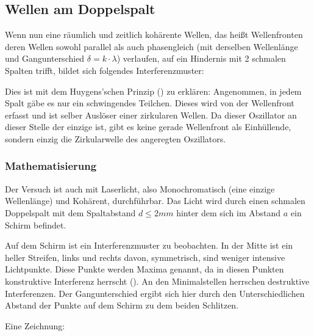 \subsection{Wellen am Doppelspalt} \label{subsec:doppelspalt}

Wenn nun eine räumlich und zeitlich kohärente Wellen, das heißt Wellenfronten deren Wellen sowohl parallel als auch phasengleich (mit derselben Wellenlänge und Gangunterschied $\delta= k \cdot \lambda$) verlaufen, auf ein Hindernis mit 2 schmalen Spalten trifft, bildet sich folgendes Interferenzmuster:


Dies ist mit dem Huygens'schen Prinzip () zu erklären: Angenommen, in jedem Spalt gäbe es nur ein schwingendes Teilchen. Dieses wird von der Wellenfront erfasst und ist selber Auslöser einer zirkularen Wellen. Da dieser Oszillator an dieser Stelle der einzige ist, gibt es keine gerade Wellenfront als Einhüllende, sondern einzig die Zirkularwelle des angeregten Oszillators.


\subsubsection{Mathematisierung}

	Der Versuch ist auch mit Laserlicht, also Monochromatisch (eine einzige Wellenlänge) und Kohärent, durchführbar. Das Licht wird durch einen schmalen Doppelspalt mit dem Spaltabstand $d \leq 2mm$ hinter dem sich im Abstand $a$ ein Schirm befindet. 
	
	Auf dem Schirm ist ein Interferenzmuster zu beobachten. In der Mitte ist ein heller Streifen, links und rechts davon, symmetrisch, sind weniger intensive Lichtpunkte. Diese Punkte werden Maxima genannt, da in diesen Punkten konstruktive Interferenz herrscht (). An den Minimalstellen herrschen destruktive Interferenzen. Der Gangunterschied ergibt sich hier durch den Unterschiedlichen Abstand der Punkte auf dem Schirm zu dem beiden Schlitzen.
	
	Eine Zeichnung:
	
	
